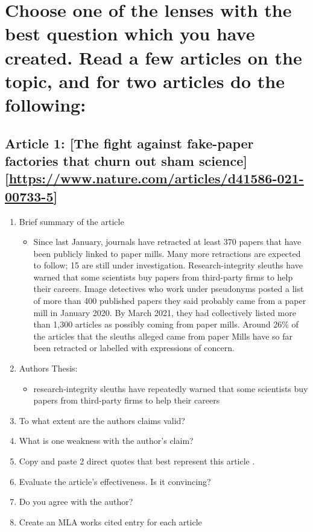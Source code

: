 \documentclass{scrartcl}
\begin{document}
\section{Choose one of the lenses with the best question which you have created. Read a few articles on the topic, and for two articles do the following:}
\label{sec:org644f31a}
\subsection{Article 1: [The fight against fake-paper factories that churn out sham science][\url{https://www.nature.com/articles/d41586-021-00733-5}]}
\label{sec:org857fe92}
\begin{enumerate}
\item Brief summary of the article
\begin{itemize}
\item Since last January, journals have retracted at least 370 papers that have
been publicly linked to paper mills. Many more retractions are expected to
follow; 15 are still under investigation. Research-integrity sleuths have
warned that some scientists buy papers from third-party firms to help their
careers. Image detectives who work under pseudonyms posted a list of more
than 400 published papers they said probably came from a paper mill in
January 2020. By March 2021, they had collectively listed more than 1,300
articles as possibly coming from paper mills. Around 26\% of the articles
that the sleuths alleged came from paper Mills have so far been retracted
or labelled with expressions of concern.
\end{itemize}

\item Authors Thesis:
\begin{itemize}
\item research-integrity sleuths have repeatedly warned that some scientists buy
papers from third-party firms to help their careers
\end{itemize}

\item To what extent are the authors claims valid?
\item What is one weakness with the author's claim?
\item Copy and paste 2 direct quotes that best represent this article .
\item Evaluate the article's effectiveness. Is it convincing?
\item Do you agree with the author?
\item Create an MLA works cited entry for each article
\end{enumerate}
\end{document}

